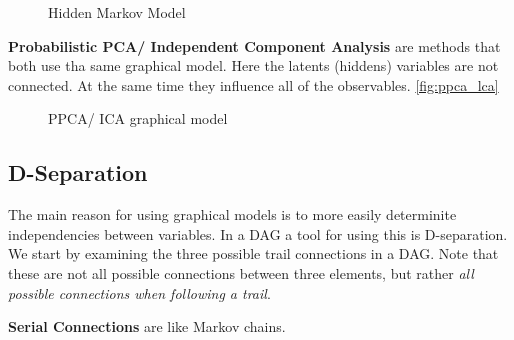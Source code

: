 \documentclass{article}
\begin{document}
\begin{figure}[h]
    \centering
    \caption{Hidden Markov Model}
    \label{fig:hidden_markov}
\end{figure}

\textbf{Probabilistic PCA/ Independent Component Analysis} are methods that both use tha same graphical model. Here the latents (hiddens) variables are not connected. At the same time they influence all of the observables. \autoref{fig:ppca_lca}


\begin{figure}[h]
    \centering
    \caption{PPCA/ ICA graphical model}
    \label{fig:ppca_lca}
\end{figure}

\subsection{D-Separation}
The main reason for using graphical models is to more easily determinite independencies between variables. In a DAG a tool for using this is D-separation. We start by examining the three possible trail connections in a DAG. Note that these are not all possible connections between three elements, but rather \textit{all possible connections when following a trail}.

\textbf{Serial Connections} are like Markov chains.
\end{document}
